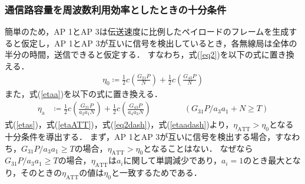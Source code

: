 \documentclass[master]{kuisthesis}		%
\begin{document}
\subsubsection{通信路容量を周波数利用効率としたときの十分条件}
簡単のため，AP 1とAP 3は伝送速度に比例したペイロードのフレームを生成すると仮定し，AP 1とAP 3が互いに信号を検出しているとき，各無線局は全体の半分の時間，送信できると仮定する．
すなわち，式(\ref{eq2})を以下の式に置き換える．
\begin{align}
\eta_0 \coloneqq \frac{1}{2} c\left(\frac{G_{21} P}{N}\right)
+ \frac{1}{2} c\left(\frac{G_{43} P}{N}\right) \label{eq2dash}
\end{align}
また，式(\ref{etaa})を以下の式に置き換える．
\begin{align}\label{etaadash}
\eta_\mathrm{a} &\coloneqq
 \frac{1}{2} c\left(\frac{G_{21} P}{a_2 a_1N}\right) + \frac{1}{2} c\left(\frac{G_{43} P}{a_4 a_3N}\right)
 \quad\quad\quad\quad(G_{31} P /a_3 a_1 + N \geq T)
 \end{align}
 式(\ref{etas})，式(\ref{etaATT})，式(\ref{eq2dash})，式(\ref{etaadash})より，$\eta_\mathrm{ATT}>\eta_0$となる十分条件を導出する．
まず，AP 1とAP 3が互いに信号を検出する場合，すなわち，$G_{31} P/a_3 a_1 \geq T$の場合，$\eta_\mathrm{ATT}>\eta_0$となることはない．
なぜなら$G_{31} P /a_3 a_1 \geq T$の場合，$\eta_\mathrm{ATT}$は$a_i$に関して単調減少であり，$a_i=1$のとき最大となり，そのときの$\eta_\mathrm{ATT}$の値は$\eta_0$と一致するためである．
\end{document}
